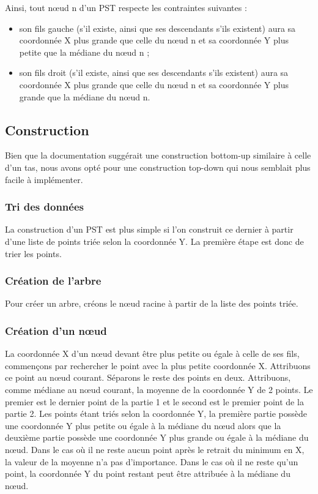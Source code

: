 \documentclass[10pt,a4paper]{article}
\begin{document}
Ainsi, tout nœud n d'un PST respecte les contraintes suivantes :
\begin{itemize}
	\item son fils gauche (s'il existe, ainsi que ses descendants s'ils existent) aura sa coordonnée X plus grande que celle du nœud n et sa coordonnée Y plus petite que la médiane du nœud n ;
	\item son fils droit (s'il existe, ainsi que ses descendants s'ils existent) aura sa coordonnée X plus grande que celle du nœud n et sa coordonnée Y plus grande que la médiane du nœud n.
\end{itemize}

\subsection{Construction}
Bien que la documentation suggérait une construction bottom-up similaire à celle d'un tas, nous avons opté pour une construction top-down qui nous semblait plus facile à implémenter.

\subsubsection{Tri des données}
La construction d'un PST est plus simple si l'on construit ce dernier à partir d'une liste de points triée selon la coordonnée Y. La première étape est donc de trier les points.

\subsubsection{Création de l'arbre}
Pour créer un arbre, créons le nœud racine à partir de la liste des points triée.

\subsubsection{Création d'un nœud}
La coordonnée X d'un nœud devant être plus petite ou égale à celle de ses fils, commençons par rechercher le point avec la plus petite coordonnée X. Attribuons ce point au nœud courant. Séparons le reste des points en deux. Attribuons, comme médiane au nœud courant, la moyenne de la coordonnée Y de 2 points. Le premier est le dernier point de la partie 1 et le second est le premier point de la partie 2. Les points étant triés selon la coordonnée Y, la première partie possède une coordonnée Y plus petite ou égale à la médiane du nœud alors que la deuxième partie possède une coordonnée Y plus grande ou égale à la médiane du nœud. Dans le cas où il ne reste aucun point après le retrait du minimum en X, la valeur de la moyenne n'a pas d'importance. Dans le cas où il ne reste qu'un point, la coordonnée Y du point restant peut être attribuée à la médiane du nœud.
\end{document}
